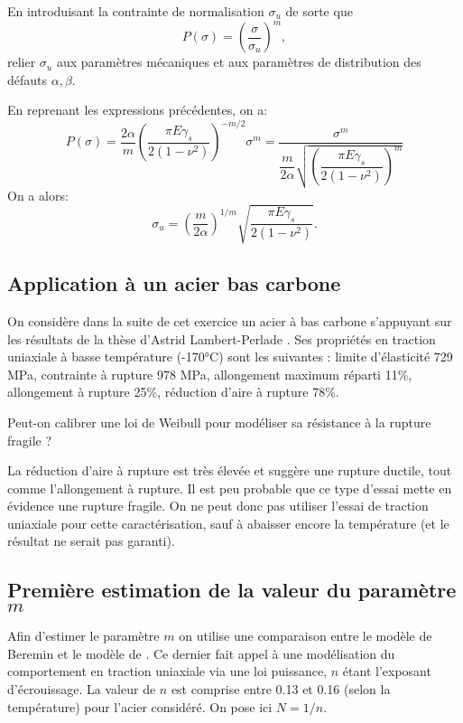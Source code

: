 \begin{questions}
\question En introduisant la contrainte de normalisation $\sigma_u$ de sorte que
\begin{equation}
P(\sigma) =  \left(\dfrac{\sigma}{\sigma_u}\right)^m,
\end{equation}
relier $\sigma_u$ aux paramètres mécaniques et aux paramètres de distribution des défauts $\alpha,\beta$.
\begin{solution}
En reprenant les expressions précédentes, on a:
$$ P(\sigma) = \dfrac{2\alpha}{m}\left(\dfrac{\pi E \gamma_s}{2(1-\nu^2)}\right)^{-m/2} \sigma^{m} = \dfrac{\sigma^m}{\dfrac{m}{2\alpha}\sqrt{\left(\dfrac{\pi E \gamma_s}{2(1-\nu^2)}\right)^m}}$$
On a alors:
$$\sigma_u = \left(\dfrac{m}{2\alpha}\right)^{1/m}\sqrt{\dfrac{\pi E \gamma_s}{2(1-\nu^2)}}.$$
\end{solution}

\subsection{Application à un acier bas carbone}
On considère dans la suite de cet exercice un acier à bas carbone s'appuyant sur les résultats de la thèse d’Astrid
Lambert-Perlade \cite{lambert2001rupture}. Ses propriétés en traction uniaxiale à
basse température (-170°C) sont les suivantes : limite d’élasticité 729 MPa, contrainte à rupture
978 MPa, allongement maximum réparti 11\%, allongement à rupture 25\%, réduction d’aire à rupture
78\%. 

\question Peut-on calibrer une loi de Weibull pour modéliser sa résistance à la rupture
fragile ?
\begin{solution}
La réduction d'aire à rupture est très élevée et suggère une rupture ductile, tout comme l'allongement à
rupture. Il est peu probable que ce type d'essai mette en évidence une rupture fragile. On ne peut donc
pas utiliser l'essai de traction uniaxiale pour cette caractérisation, sauf à abaisser encore la température
(et le résultat ne serait pas garanti).
\end{solution}

\subsection{Première estimation de la valeur du paramètre $m$}

Afin d’estimer le paramètre $m$ on utilise une comparaison entre le modèle de Beremin et le modèle de
\cite{curry1979effect}. Ce dernier fait appel à une modélisation du comportement en traction uniaxiale
via une loi puissance, $n$ étant l’exposant d’écrouissage. La valeur de $n$ est comprise entre 0.13 et 0.16
(selon la température) pour l’acier considéré. On pose ici $N = 1/n$.


\end{questions}
